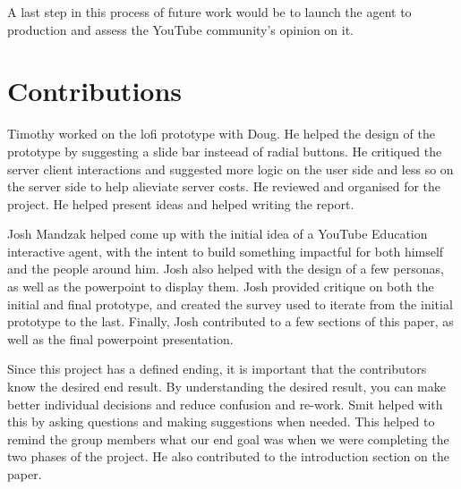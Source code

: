 \documentclass[letterpaper]{article} %
\begin{document}
A last step in this process of future work would be to launch the agent to production and assess the YouTube community’s opinion on it.


\section{Contributions}

Timothy worked on the lofi prototype with Doug. He helped the design of the prototype by suggesting a slide bar insteead of radial buttons. He critiqued the server client interactions and suggested more logic on the user side and less so on the server side to help alieviate server costs. He reviewed and organised for the project. He helped present ideas and helped writing the report. 

Josh Mandzak helped come up with the initial idea of a YouTube Education interactive agent, with the intent to build something impactful for both himself and the people around him. Josh also helped with the design of a few personas, as well as the powerpoint to display them. Josh provided critique on both the initial and final prototype, and created the survey used to iterate from the initial prototype to the last. Finally, Josh contributed to a few sections of this paper, as well as the final powerpoint presentation.

Since this project has a defined ending, it is important that the contributors know the desired end result. By understanding the desired result, you can make better individual decisions and reduce confusion and re-work. Smit helped with this by asking questions and making suggestions when needed. This helped to remind the group members what our end goal was when we were completing the two phases of the project. He also contributed to the introduction section on the paper.
\end{document}
